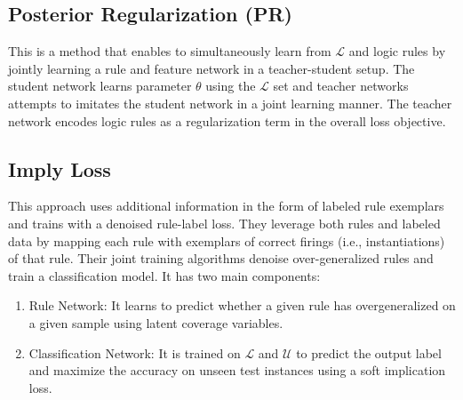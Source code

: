 \documentclass[11pt]{article}
\newcommand{\Ucal}{\mathcal{U}}
\newcommand{\Lcal}{\mathcal{L}}
\begin{document}
\subsection{Posterior Regularization (PR)~\citep{Hu2016Harnessing}}
This is a method that enables to simultaneously learn from $\Lcal$ and logic rules by jointly learning a rule and feature network in a teacher-student setup. The student network learns parameter $\theta$ using the $\Lcal$ set and teacher networks attempts to imitates the student network in a joint learning manner. The teacher network encodes logic rules as a regularization term in the overall loss objective.

\subsection{Imply Loss~\citep{awasthi2020learning}}
This approach uses additional information in the form of labeled rule exemplars and trains with a denoised rule-label loss.  They leverage both rules and labeled data by mapping each rule with exemplars of correct firings (i.e., instantiations) of that rule. Their joint training algorithms
denoise over-generalized rules and train a classification model. It has two main components:
\begin{enumerate}
\item {Rule Network}: It learns to predict whether a given rule has overgeneralized on a given sample using latent coverage variables. 
\item  Classification Network: It is trained on $\Lcal$ and $\Ucal$ to predict the output label and maximize the accuracy on unseen test instances using a soft implication loss. 
\end{enumerate}
\end{document}
